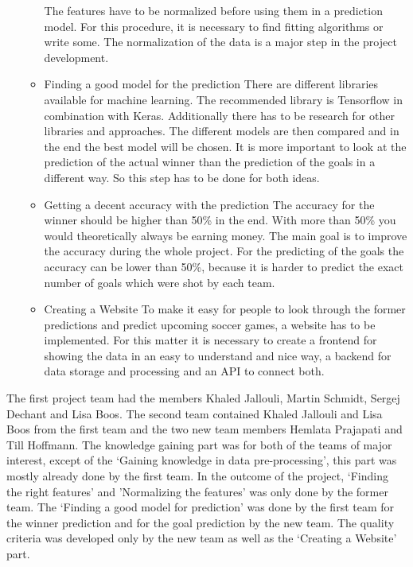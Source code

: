 \begin{itemize}
\begin{itemize}
			The features have to be normalized before using them in a prediction model. For this procedure, it is necessary to find fitting algorithms or write some. The normalization of the data is a major step in the project development.
			\item Finding a good model for the prediction\newline
			There are different libraries available for machine learning. The recommended library is Tensorflow in combination with Keras. Additionally there has to be research for other libraries and approaches. The different models are then compared and in the end the best model will be chosen. It is more important to look at the prediction of the actual winner than the prediction of the goals in a different way. So this step has to be done for both ideas.
			\item Getting a decent accuracy with the prediction\newline
			The accuracy for the winner should be higher than 50\% in the end. With more than 50\% you would theoretically always be earning money. The main goal is to improve the accuracy during the whole project. For the predicting of the goals the accuracy can be lower than 50\%, because it is harder to predict the exact number of goals which were shot by each team.
			\item Creating a Website\newline
			To make it easy for people to look through the former predictions and predict upcoming soccer games, a website has to be implemented. For this matter it is necessary to create a frontend for showing the data in an easy to understand and nice way, a backend for data storage and processing and an API to connect both.
		\end{itemize}
\end{itemize}

The first project team had the members Khaled Jallouli, Martin Schmidt, Sergej Dechant and Lisa Boos. The second team contained Khaled Jallouli and Lisa Boos from the first team and the two new team members Hemlata Prajapati and Till Hoffmann. The knowledge gaining part was for both of the teams of major interest, except of the `Gaining knowledge in data pre-processing', this part was mostly already done by the first team. In the outcome of the project, `Finding the right features' and 'Normalizing the features' was only done by the former team. The `Finding a good model for prediction' was done by the first team for the winner prediction and for the goal prediction by the new team. The quality criteria was developed only by the new team as well as the `Creating a Website' part.

